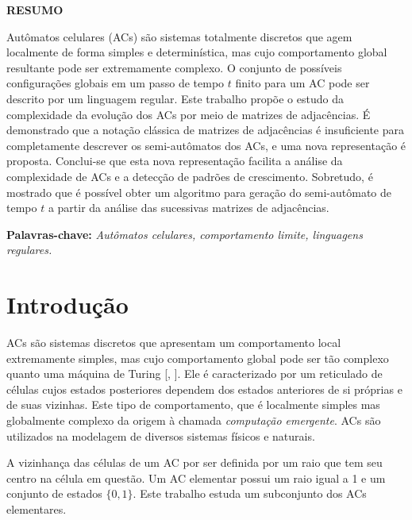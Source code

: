 \documentclass[12pt,a4paper]{article}
\begin{document}
\newpage
\thispagestyle{plain}
\begin{center}
\large  
\textbf{RESUMO}
\end{center}
\renewcommand{\baselinestretch}{0.6666666}
Autômatos celulares (ACs) são sistemas totalmente discretos que agem localmente
de forma simples e determinística, mas cujo comportamento global resultante
pode ser extremamente complexo. O conjunto de possíveis configurações globais 
em um passo de tempo $t$ finito para um AC pode ser descrito por um
linguagem regular. Este trabalho propõe o estudo da complexidade da
evolução dos ACs por meio de matrizes de adjacências. É
demonstrado que a notação clássica de matrizes de adjacências é
insuficiente para completamente descrever os semi-autômatos dos
ACs, e uma nova representação é proposta. Conclui-se que
esta nova representação facilita a análise da complexidade de ACs
e a detecção de padrões de crescimento. Sobretudo, é
mostrado que é possível obter um algoritmo para geração do semi-autômato de
tempo $t$ a partir da análise das sucessivas matrizes de adjacências.
\\[0.5cm]
\begin{flushleft}
{\bf Palavras-chave:} {\it Autômatos celulares, comportamento limite, linguagens regulares.}
\end{flushleft}

\newpage
\thispagestyle{empty}
\tableofcontents

\newpage
\pagestyle{plain}
\renewcommand{\baselinestretch}{1.5} 
\normalsize

\newcommand{\citecustom}[1]{[\citeauthoronline{#1}, \citeyear{#1}]}

\section{Introdução}

ACs são sistemas discretos que apresentam um comportamento
local extremamente simples, mas cujo comportamento global pode ser tão
complexo quanto uma máquina de Turing \citecustom{wolfram1984a}. Ele
é caracterizado por um reticulado de células cujos estados posteriores
dependem dos estados anteriores de si próprias e de suas vizinhas.
Este tipo de comportamento, que é localmente simples mas globalmente
complexo da origem à chamada \textit{computação emergente}. 
ACs são utilizados na modelagem de diversos sistemas
físicos e naturais.

A vizinhança das células de um AC por ser definida por
um raio que tem seu centro na célula em questão. Um AC
elementar possui um raio igual a 1 e um conjunto de estados $\{0,1\}$.
Este trabalho estuda um subconjunto dos ACs elementares.
\end{document}
